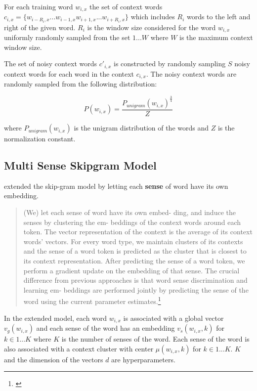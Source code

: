 For each training word $w_{i, x}$ the set of context words $c_{i, x} = \{ w_{i - R_i, x} ... w_{i - 1, x} w_{i + 1, x} ... w_{i + R_i, x} \}$ which includes $R_i$ words to the left and right of the given word. $R_i$ is the window size considered for the word $w_{i,x}$ uniformly randomly sampled from the set $1 ... W$ where $W$ is the maximum context window size.

The set of noisy context words $c'_{i, x}$ is constructed by randomly sampling $S$ noisy context words for each word in the context $c_{i, x}$. The noisy context words are randomly sampled from the following distribution:

\[P(w_{i, x}) = \frac{P_{unigram}(w_{i,x})^\frac{3}{4}}{Z}\]

where $P_{unigram}(w_{i,x})$ is the unigram distribution of the words and $Z$ is the normalization constant.

\subsection{Multi Sense Skipgram Model}

\cite{neelakantan2015efficient} extended the skip-gram model by letting each \textbf{sense} of word have its own embedding.

\begin{quote}
(We) let each sense of word have its own embed- ding, and induce the senses by clustering the em- beddings of the context words around each token. The vector representation of the context is the average of its context words’ vectors. For every word type, we maintain clusters of its contexts and the sense of a word token is predicted as the cluster that is closest to its context representation. After predicting the sense of a word token, we perform a gradient update on the embedding of that sense. The crucial difference from previous approaches is that word sense discrimination and learning em- beddings are performed jointly by predicting the sense of the word using the current parameter estimates.\footnote{\cite{neelakantan2015efficient}}
\end{quote}

In the extended model, each word $w_{i,x}$ is associated with a global vector $v_g(w_{i,x})$ and each sense of the word has an embedding $v_s(w_{i,x}, k)$ for $k \in 1 ... K$ where $K$ is the number of senses of the word. Each sense of the word is also associated with a context cluster with center $\mu(w_{i,x}, k)$ for $k \in 1 ... K$. $K$ and the dimension of the vectors $d$ are hyperparameters.

